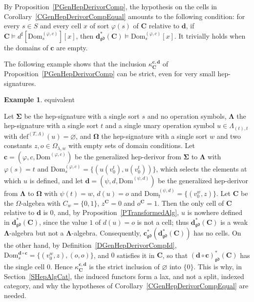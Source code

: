 \documentclass[a4paper, reqno]{amsbook}
\makeatletter
\newcommand{\sig}[1]{\mathbf{#1}}             %
\newcommand{\Dom}{\mathrm{Dom}}
\newcommand{\gd}{\mathfrak{gd}}              %
\theoremstyle{plain}
\theoremstyle{definition}
\newtheorem{example}[theorem]{Example}
\newcommand*{\CA@leanpending}{}
\newcommand*{\CA@leanrelation}{}
\newcommand*{\lean}[2]{%
  \ifcsname\string\color@lean@#1\endcsname\else
    \PackageError{main}{Unknown relation `#1' in \string\lean}{Use equivalent, weaker or stronger.}%
  \fi
  \gdef\CA@leanrelation{#1}%
  \gdef\CA@leanpending{#2}}
\makeatother
\begin{document}
By Proposition~\ref{PGenHepDerivorComp}, the hypothesis on the cells in Corollary~\ref{CGenHepDerivorCompEqual} amounts to the following condition: for every $s\in S$ and every cell $x$ of sort $\varphi(s)$ of $\mathbf{C}$ relative to $\mathbf{d}$, if $\mathbf{C}\models d^{\sharp}[\Dom^{(\varphi,c)}_{s}][x]$, then $\mathbf{d}^{\ast}_{\gd}(\mathbf{C})\models\Dom^{(\varphi,c)}_{s}[x]$.
It trivially holds when the domains of $\mathbf{c}$ are empty.

The following example shows that the inclusion $\kappa^{\mathbf{c},\mathbf{d}}_{\mathbf{C}}$ of Proposition~\ref{PGenHepDerivorComp} can be strict, even for very small hep-signatures.

\begin{example}\label{EStrictComparison}\lean{equivalent}{StrictComparison.comparison_not_isIso,exists_noninvertible_comparison}
Let $\sig{\Sigma}$ be the hep-signature with a single sort $s$ and no operation symbols, $\sig{\Lambda}$ the hep-signature with a single sort $t$ and a single unary operation symbol $u\in\Lambda_{(t),t}$ with $\mathrm{def}^{(T,\Lambda)}(u)=\varnothing$, and $\sig{\Omega}$ the hep-signature with a single sort $w$ and two constants $z,o\in\Omega_{\lambda,w}$ with empty sets of domain conditions.
Let $\mathbf{c}=(\varphi,c,\Dom^{(\varphi,c)})$ be the generalized hep-derivor from $\sig{\Sigma}$ to $\sig{\Lambda}$ with $\varphi(s)=t$ and $\Dom^{(\varphi,c)}_{s}=\{(u(v^{t}_{0}),u(v^{t}_{0}))\}$, which selects the elements at which $u$ is defined, and let $\mathbf{d}=(\psi,d,\Dom^{(\psi,d)})$ be the generalized hep-derivor from $\sig{\Lambda}$ to $\sig{\Omega}$ with $\psi(t)=w$, $d(u)=o$ and $\Dom^{(\psi,d)}_{t}=\{(v^{w}_{0},z)\}$.
Let $\mathbf{C}$ be the $\Omega$-algebra with $C_{w}=\{0,1\}$, $z^{\mathbf{C}}=0$ and $o^{\mathbf{C}}=1$.
Then the only cell of $\mathbf{C}$ relative to $\mathbf{d}$ is $0$, and, by Proposition~\ref{PTransformedAlg}, $u$ is nowhere defined in $\mathbf{d}^{\ast}_{\gd}(\mathbf{C})$, since the value $1$ of $d(u)=o$ is not a cell; thus $\mathbf{d}^{\ast}_{\gd}(\mathbf{C})$ is a weak $\sig{\Lambda}$-algebra but not a $\sig{\Lambda}$-algebra.
Consequently, $\mathbf{c}^{\ast}_{\gd}(\mathbf{d}^{\ast}_{\gd}(\mathbf{C}))$ has no cells.
On the other hand, by Definition~\ref{DGenHepDerivorCompId}, $\Dom^{\mathbf{d}\circ\mathbf{c}}_{s}=\{(v^{w}_{0},z),(o,o)\}$, and $0$ satisfies it in $\mathbf{C}$, so that $(\mathbf{d}\circ\mathbf{c})^{\ast}_{\gd}(\mathbf{C})$ has the single cell $0$.
Hence $\kappa^{\mathbf{c},\mathbf{d}}_{\mathbf{C}}$ is the strict inclusion of $\varnothing$ into $\{0\}$.
This is why, in Section~\ref{SHepAlgCat}, the induced functors form a lax, and not a split, indexed category, and why the hypotheses of Corollary~\ref{CGenHepDerivorCompEqual} are needed.
\end{example}
\end{document}
